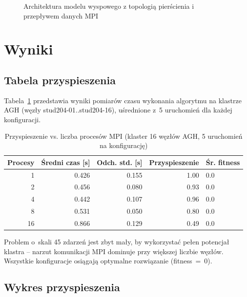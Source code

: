 \documentclass[12pt,a4paper]{article}
\begin{document}
\begin{figure}[H]
\begin{tikzpicture}
\end{tikzpicture}
\caption{Architektura modelu wyspowego z topologi\k{a} pier\'{s}cienia i przep\l{}ywem danych MPI}
\label{fig:island-model}
\end{figure}

\section{Wyniki}

\subsection{Tabela przyspieszenia}

Tabela~\ref{tab:speedup} przedstawia wyniki pomiar\'{o}w czasu wykonania algorytmu na klastrze AGH (w\k{e}z\l{}y stud204-01..stud204-16), u\'{s}rednione z~5 uruchomie\'{n} dla ka\.{z}dej konfiguracji.

\begin{table}[H]
\centering
\begin{tabular}{rrrrl}
\toprule
\textbf{Procesy} & \textbf{\'{S}redni czas [s]} & \textbf{Odch. std. [s]} & \textbf{Przyspieszenie} & \textbf{\'{S}r. fitness} \\
\midrule
1  & 0.426 & 0.155 & 1.00 & 0.0 \\
2  & 0.456 & 0.080 & 0.93 & 0.0 \\
4  & 0.442 & 0.107 & 0.96 & 0.0 \\
8  & 0.531 & 0.050 & 0.80 & 0.0 \\
16 & 0.866 & 0.129 & 0.49 & 0.0 \\
\bottomrule
\end{tabular}
\caption{Przyspieszenie vs. liczba proces\'{o}w MPI (klaster 16 w\k{e}z\l{}\'{o}w AGH, 5 uruchomie\'{n} na konfiguracj\k{e})}
\label{tab:speedup}
\end{table}

\noindent Problem o~skali 45 zdarze\'{n} jest zbyt ma\l{}y, by wykorzysta\'{c} pe\l{}en potencja\l{} klastra -- narzut komunikacji MPI dominuje przy wi\k{e}kszej liczbie w\k{e}z\l{}\'{o}w. Wszystkie konfiguracje osi\k{a}gaj\k{a} optymalne rozwi\k{a}zanie (fitness~=~0).

\subsection{Wykres przyspieszenia}
\end{document}
